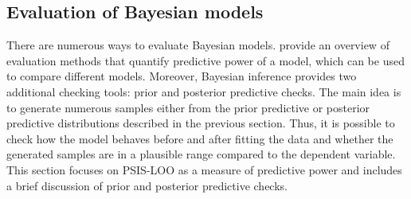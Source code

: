 \subsection{Evaluation of Bayesian models}
\label{ch:bayesian_evaluation}

There are numerous ways to evaluate Bayesian models.
\cite{piironen_comparison_2017} provide an overview of evaluation methods that quantify predictive power of a model, which can be used to compare different models.
Moreover, Bayesian inference provides two additional checking tools: prior and posterior predictive checks.
The main idea is to generate numerous samples either from the prior predictive or posterior predictive distributions described in the previous section.
Thus, it is possible to check how the model behaves before and after fitting the data and whether the generated samples are in a plausible range compared to the dependent variable.
This section focuses on PSIS-LOO as a measure of predictive power and includes a brief discussion of prior and posterior predictive checks.

